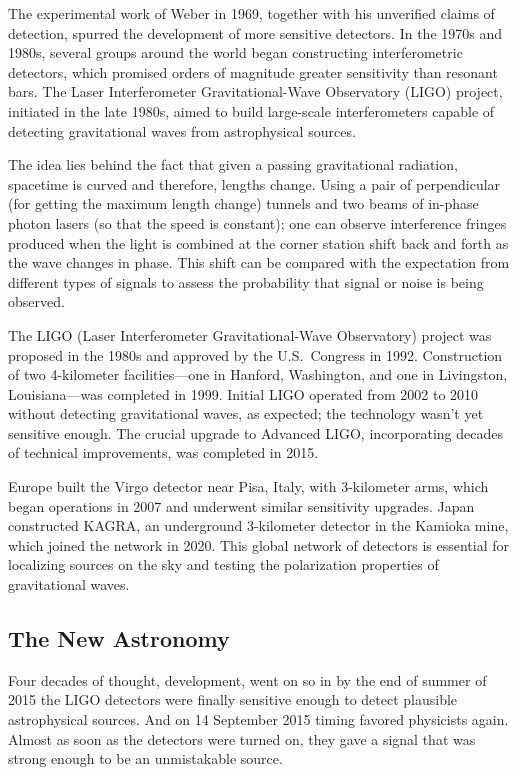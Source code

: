 The experimental work of Weber in 1969, together with his unverified claims of detection, spurred the development of more sensitive detectors.
In the 1970s and 1980s, several groups around the world began constructing interferometric detectors, which promised orders of magnitude greater sensitivity than resonant bars.
The Laser Interferometer Gravitational-Wave Observatory (LIGO) project, initiated in the late 1980s, aimed to build large-scale interferometers capable of detecting gravitational waves from astrophysical sources\cite{weiss_republication_2022}.

The idea lies behind the fact that given a passing gravitational radiation, spacetime is curved and therefore, lengths change.
Using a pair of perpendicular (for getting the maximum length change) tunnels and two beams of in-phase photon lasers (so that the speed is constant); one can observe interference fringes produced when the light is combined at the corner station shift back and forth as the wave changes in phase.
This shift can be compared with the expectation from different types of signals to assess the probability that signal or noise is being observed\cite{miller_new_2019}.

The LIGO (Laser Interferometer Gravitational-Wave Observatory) project was proposed in the 1980s and approved by the U.S.\ Congress in 1992.
Construction of two 4-kilometer facilities—one in Hanford, Washington, and one in Livingston, Louisiana—was completed in 1999.
Initial LIGO operated from 2002 to 2010 without detecting gravitational waves, as expected; the technology wasn't yet sensitive enough.
The crucial upgrade to Advanced LIGO, incorporating decades of technical improvements, was completed in 2015.


Europe built the Virgo detector near Pisa, Italy, with 3-kilometer arms, which began operations in 2007 and underwent similar sensitivity upgrades.
Japan constructed KAGRA, an underground 3-kilometer detector in the Kamioka mine, which joined the network in 2020.
This global network of detectors is essential for localizing sources on the sky and testing the polarization properties of gravitational waves.

\subsection{The New Astronomy}\label{subsec:the-new-astronomy}

Four decades of thought, development, went on so in by the end of summer of 2015 the LIGO detectors were finally sensitive enough to detect plausible astrophysical sources.
And on 14 September 2015 timing favored physicists again.
Almost as soon as the detectors were turned on, they gave a signal that was strong enough to be an unmistakable source\cite{abbott_observation_2016a}.


